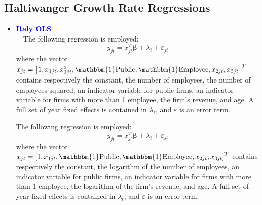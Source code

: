 \documentclass[12pt,notitlepage]{article}
\newcommand{\sym}[1] {\ifmmode^{#1} \else\(^{#1}\) \fi}
\begin{document}
\subsection{Haltiwanger Growth Rate Regressions}

\begin{itemize} %
\item \textcolor{blue}{\textbf{Italy OLS}}\\~\
The following regression is employed:
	\begin{equation}
	y_{jt} = x^{T}_{jt}\mathbf{\beta} + \lambda_{t} + \varepsilon_{jt}
	\end{equation}
where the vector $x_{jt} = \left[  1, x_{1jt}, x^{2}_{1jt}, \mathbbm{1}\text{Public}, \mathbbm{1}\text{Employee}, x_{2jt}, x_{3jt}  \right]^{T} $ contains respectively the constant, the number of employees, the number of employees squared, an indicator variable for public firms, an indicator variable for firms with more than 1 employee, the firm's revenue, and age. A full set of year fixed effects is contained in $\lambda_{t}$, and $\varepsilon$ is an error term.

\begin{table}[htbp]\centering
\def\sym#1{\ifmmode^{#1}\else\(^{#1}\)\fi}
\caption{Haltiwanger growth rate}
\end{table}

\clearpage
The following regression is employed:
	\begin{equation}
	y_{jt} = x^{T}_{jt}\mathbf{\beta} + \lambda_{t} + \varepsilon_{jt}
	\end{equation}
where the vector $x_{jt} = \left[  1, x_{1jt}, \mathbbm{1}\text{Public}, \mathbbm{1}\text{Employee}, x_{2jt}, x_{3jt}  \right]^{T} $ contains respectively the constant, the logarithm of the number of employees, an indicator variable for public firms, an indicator variable for firms with more than 1 employee, the logarithm of the firm's revenue, and age. A full set of year fixed effects is contained in $\lambda_{t}$, and $\varepsilon$ is an error term.
\begin{table}[htbp]\centering
\def\sym#1{\ifmmode^{#1}\else\(^{#1}\)\fi}
\caption{Haltiwanger growth rate}
\end{table}


\end{itemize}
\end{document}
